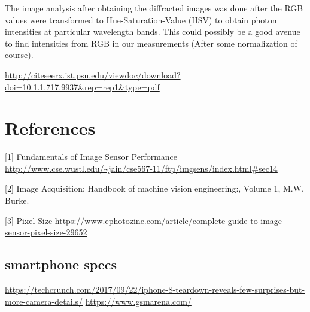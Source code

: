 \documentclass{article}
\begin{document}
The image analysis after obtaining the diffracted images was done after the RGB values
were transformed to Hue-Saturation-Value (HSV) to obtain photon intensities at
particular wavelength bands. This could possibly be a good avenue to find intensities
from RGB in our measurements (After some normalization of course).


\url{http://citeseerx.ist.psu.edu/viewdoc/download?doi=10.1.1.717.9937&rep=rep1&type=pdf}


\section{References}
[1] Fundamentals of Image Sensor Performance \url{http://www.cse.wustl.edu/~jain/cse567-11/ftp/imgsens/index.html#sec14}

[2] Image Acquisition: Handbook of machine vision engineering:, Volume 1, M.W. Burke.

[3] Pixel Size \url{https://www.ephotozine.com/article/complete-guide-to-image-sensor-pixel-size-29652}

\subsection{smartphone specs}
\url{https://techcrunch.com/2017/09/22/iphone-8-teardown-reveals-few-surprises-but-more-camera-details/}
\url{https://www.gsmarena.com/}
\end{document}
